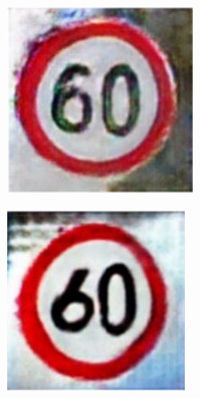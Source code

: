 \begin{figure}[h]
\begin{subfigure}{0.125\textwidth}
    \end{subfigure}
    \hspace{2em}%
    \begin{subfigure}{0.125\textwidth}
        \centering
        \includegraphics[height=\textwidth]{../images/Taiwan Schilder/Generated6.png}
    \end{subfigure}
    \hspace{2em}%
    \begin{subfigure}{0.125\textwidth}
        \centering
        \includegraphics[height=\textwidth]{../images/Taiwan Schilder/Generated7.png}

\end{subfigure}
\end{figure}

